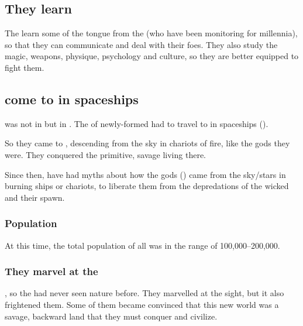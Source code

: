 \subsection{They learn \Draconic}
The \resphain{} learn some of the \Draconic{} tongue from the \banelords{} (who have been monitoring \Miith{} for millennia), so that they can communicate and deal with their foes. 
They also study the \psp{\dragons}{} magic, weapons, physique, psychology and culture, so they are better equipped to fight them. 









\subsection{\Resphain{} come to \Tembrae{} in spaceships}
\Merkyrah{} was not in \Tembrae{} but in \Nyx. 
The \resphain{} of newly-formed \KiriathSepher{} had to travel to \Tembrae{} in spaceships (). 

So they came to \Tembrae{}, descending from the sky in chariots of fire, like the gods they were. 
They conquered the primitive, savage \humans{} living there. 

Since then, \humans{} have had myths about how the gods (\resphain) came from the sky/stars in burning ships or chariots, to liberate them from the depredations of the wicked \dragons{} and their spawn.





\subsubsection{Population}
At this time, the total population of all \resphain{} was in the range of 100,000--200,000. 





\subsubsection{They marvel at the \Wylde}
, so the \resphain{} had never seen \Wylde{} nature before. 
They marvelled at the sight, but it also frightened them. 
Some of them became convinced that this new world was a savage, backward land that they must conquer and civilize. 

